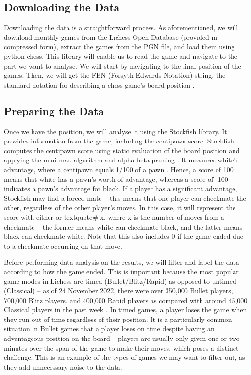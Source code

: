\documentclass[%
 superscriptaddress,
showpacs,preprintnumbers,
 amsmath,
 amssymb,
 aps,
 pra,
showkeys,
onecolumn,
notitlepage,
11pt,
tightenlines      %
]{revtex4-1}
\begin{document}
\subsection{Downloading the Data}
Downloading the data is a straightforward process. As aforementioned, we will download monthly games from the Lichess Open Database (provided in compressed form), extract the games from the PGN file, and load them using python-chess. This library will enable us to read the game and navigate to the part we want to analyse. We will start by navigating to the final position of the games. Then, we will get the FEN (Forsyth-Edwards Notation) string, the standard notation for describing a chess game's board position \cite{pgnSpecification}. 

\subsection{Preparing the Data}
Once we have the position, we will analyse it using the Stockfish library. It provides information from the game, including the centipawn score. Stockfish computes the centipawn score using static evaluation of the board position and applying the mini-max algorithm and alpha-beta pruning \cite{maharaj2022chess}. It measures white's advantage, where a centipawn equals 1/100 of a pawn \cite{centipawnDefinition}. Hence, a score of 100 means that white has a pawn's worth of advantage, whereas a score of -100 indicates a pawn's advantage for black. If a player has a significant advantage, Stockfish may find a forced mate -- this means that one player can checkmate the other, regardless of the other player's moves. In this case, it will represent the score with either  or textquote{\#{-x}}, where x is the number of moves from a checkmate -- the former means white can checkmate black, and the latter means black can checkmate white. Note that this also includes 0 if the game ended due to a checkmate occurring on that move.

Before performing data analysis on the results, we will filter and label the data according to how the game ended. This is important because the most popular game modes in Lichess are timed (Bullet/Blitz/Rapid) as opposed to untimed (Classical) -- as of 24 November 2022, there were over 350,000 Bullet players, 700,000 Blitz players, and 400,000 Rapid players as compared with around 45,000 Classical players in the past week \cite{lichessBlitzRatingDistribution}. In timed games, a player loses the game when they run out of time regardless of their position. It is a particularly common situation in Bullet games that a player loses on time despite having an advantageous position on the board -- players are usually only given one or two minutes over the span of the game to make their moves, which poses a distinct challenge. This is an example of the types of games we may want to filter out, as they add unnecessary noise to the data.
\end{document}
